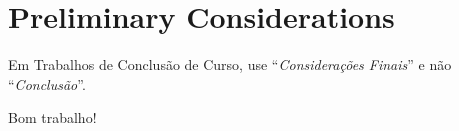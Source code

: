 \chapter{Preliminary Considerations}\label{conclusao}

Em Trabalhos de Conclusão de Curso, use ``\emph{Considerações Finais}'' e não ``\emph{Conclusão}''.

Bom trabalho!
